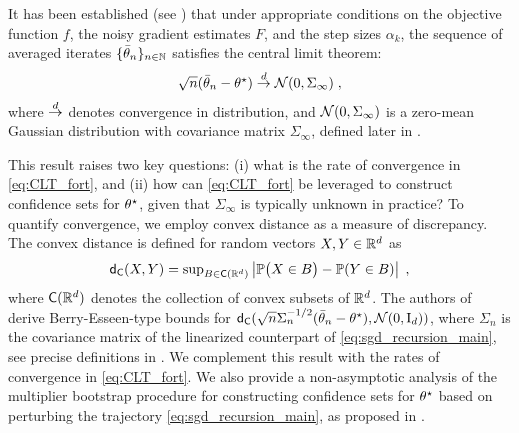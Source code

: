 It has been established (see \cite[Theorem 3]{polyak1992acceleration}) that under appropriate conditions on the objective function $f$, the noisy gradient estimates $F$, and the step sizes $\alpha_k$, the sequence of averaged iterates $\{\bar{\theta}_{n}\}_{n \in \mathbb{N}}$ satisfies the central limit theorem:
\begin{equation}
\label{eq:CLT_fort}
\textstyle 
\sqrt{n}(\bar{\theta}_{n} - \theta^\star) \overset{d}{\to} \mathcal{N}(0,\Sigma_\infty)\;,
\end{equation}
where $\overset{d}{\to}$ denotes convergence in distribution, and $\mathcal{N}(0,\Sigma_\infty)$ is a zero-mean Gaussian distribution with covariance matrix $\Sigma_\infty$, defined later in .  

This result raises two key questions: (i) what is the rate of convergence in \eqref{eq:CLT_fort}, and (ii) how can \eqref{eq:CLT_fort} be leveraged to construct confidence sets for $\theta^\star$, given that $\Sigma_\infty$ is typically unknown in practice? To quantify convergence, we employ convex distance as a measure of discrepancy. The convex distance is defined for random vectors $X, Y \in \mathbb{R}^d$ as  
\begin{equation}
\label{eq:convex-distance-definiton}
\textstyle 
\mathsf{d}_{\mathsf{C}}(X, Y) = \sup_{B \in \mathsf{C}(\mathbb{R}^{d})}\left|\mathbb{P}\bigl(X \in B\bigr) - \mathbb{P}(Y \in B)\right|\;,
\end{equation}
where $\mathsf{C}(\mathbb{R}^{d})$ denotes the collection of convex subsets of $\mathbb{R}^{d}$. The authors of \cite{shao2022berry} derive Berry-Esseen-type bounds for $\mathsf{d}_{\mathsf{C}}(\sqrt{n}\Sigma_{n}^{-1/2}(\bar{\theta}_{n} - \theta^\star), \mathcal{N}(0,\mathrm{I}_d))$, where $\Sigma_n$ is the covariance matrix of the linearized counterpart of \eqref{eq:sgd_recursion_main}, see precise definitions in . We complement this result with the rates of convergence in \eqref{eq:CLT_fort}. We also provide a non-asymptotic analysis of the multiplier bootstrap procedure for constructing confidence sets for $\theta^\star$ based on perturbing the trajectory \eqref{eq:sgd_recursion_main}, as proposed in \cite{JMLR:v19:17-370}.  


